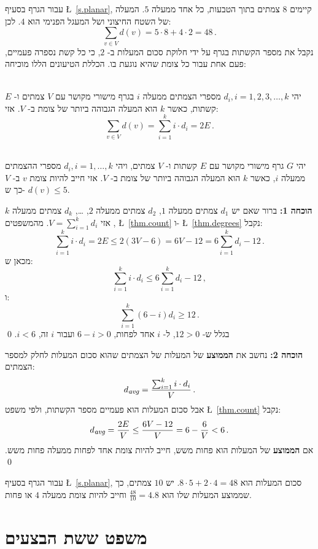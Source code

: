 עבור הגרף בסעיף
\L{~\ref{s.planar}},
קיימים 
$8$
צמתים בתוך הטבעות, כל אחד ממעלה
$5$.
המעלה של השטח החיצוני ושל המעגל הפנימי הוא 
$4$.
לכן:
\[
\sum_{v\in V} d(v) = 5\cdot 8 + 4\cdot 2=48\,.
\]
נקבל את מספר הקשתות בגרף על ידי חלוקת סכום המעלות ב-%
$2$,
כי כל קשת נספרה פעמיים, פעם אחת עבור כל צומת שהיא נוגעת בו.
הכללת הטיעונים הללו מוכיחה:
\begin{theorem}\label{thm.degrees}\mbox{}\\
יהי
$d_i, i=1,2,3,\ldots,k$
מספרי הצמתים ממעלה
$i$
בגרף מישורי מקושר עם
$V$
צמתים ו-%
$E$ 
קשתות, כאשר
$k$
הוא המעלה הגבוהה ביותר של צומת ב-%
$V$.
אזי:
\[
\sum_{v\in V} d(v) =\sum_{i=1}^{k} i\cdot d_i=2E\,.
\]
\end{theorem}
\vspace*{-6ex}
\begin{theorem}\label{thm.degree5}\mbox{}\\
יהי
$G$
גרף מישורי מקושר עם
$E$
קשתות ו-%
$V$
צמתים, ויהי
$d_i,i=1,\ldots,k$
מספרי ההצמתים ממעלה
$i$,
כאשר
$k$
הוא המעלה הגבוהה ביותר של צומת ב-%
$V$.
אזי חייב להיות צומת
$v$
ב-%
$V$
כך ש-%
$d(v) \leq 5$.
\end{theorem}
\textbf{הוכחה 1:}
ברור שאם יש 
$d_1$
צמתים ממעלה
$1$, $d_2$ 
צמתים ממעלה
$2$, \ldots, $d_k$
צמתים ממעלה
$k$, 
אזי
$V=\sum_{i=1}^{k}d_i$. 
מהמשפטים
\L{~\ref{thm.count}}
ו-%
\L{~\ref{thm.degrees}}
נקבל:
\[
\sum_{i=1}^{k} i\cdot d_i=2E\leq 2(3V-6) = 6V-12=6\sum_{i=1}^{k} d_i -12\,.
\]
מכאן ש:
\[
\sum_{i=1}^{k} i\cdot d_i \leq 6\sum_{i=1}^{k} d_i -12\,,
\]
ו:
\[
\sum_{i=1}^{k} (6-i)d_i\geq 12\,.
\]
בגלל ש-%
$12>0$,
ל-%
$i$
אחד לפחות,
$6-i>0$
ועבור 
$i$
זה,
$i<6$. 
\qed

\textbf{הוכחה 2:}
נחשב את 
\textbf{הממוצע}
של המעלות של הצמתים שהוא סכום המעלות לחלק למספר הצמתים:
\[
d_{\textit{\footnotesize avg}}=\frac{\sum_{i=1}^{k} i\cdot d_i}{V}\,.
\]
אבל סכום המעלות הוא פעמיים מספר הקשתות, ולפי משפט
\L{~\ref{thm.count}}
נקבל:
\[
d_{\textit{\footnotesize avg}}=\frac{2E}{V}\leq \frac{6V-12}{V}=6-\frac{6}{V}<6\,.
\]
אם 
\textbf{הממוצע}
של המעלות הוא פחות משש, חייב להיות צומת אחד לפחות ממעלה פחות משש.
\qed


עבור הגרף בסעיף
\L{~\ref{s.planar}},
סכום המעלות הוא
$8\cdot 5 + 2\cdot 4=48$.
יש 
$10$
צמתים, כך שממוצע המעלות שלו הוא
$\frac{48}{10}=4.8$
וחייב להיות צומת ממעלה 
$4$
או פחות.




\section{משפט ששת הבצעים}

